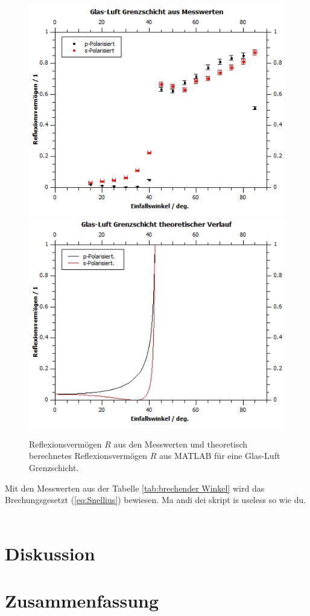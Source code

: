 \documentclass[12pt,a4paper,twoside]{article}
\begin{document}
\begin{figure}[H]
    \centering
    \includegraphics[width=0.6\linewidth]{nudes/GL Mess.jpg}
    \includegraphics[width=0.6\linewidth]{nudes/GL theor.jpg}
    \caption{Reflexionsvermögen $R$ aus den Messwerten und theoretisch berechnetes Reflexionsvermögen $R$ aus MATLAB für eine Glas-Luft Grenzschicht. }
    \label{fig:reflexionsvermögen GL}
\end{figure}

\noindent
Mit den Messwerten aus der Tabelle \ref{tab:brechender Winkel} wird das Brechungsgesetzt (\ref{eq:Snellius}) bewiesen. 
Ma andi dei skript is useless so wie du. 
\\
\\



\section{Diskussion} %


\section{Zusammenfassung} %
\end{document}
